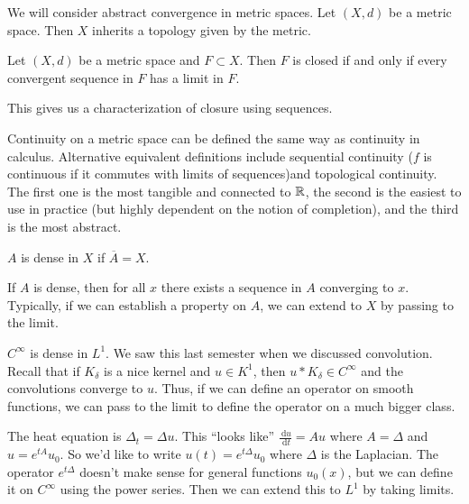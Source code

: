 \documentclass[10pt, twoside]{article}
\renewcommand{\d}{\ \mathrm{d}}
\begin{document}
    We will consider abstract convergence in metric spaces. Let $(X,d)$ be a metric space. Then $X$ inherits a topology given by the metric. 

    \begin{lem}
        Let $(X,d)$ be a metric space and $F \subset X$. Then $F$ is closed if and only if every convergent sequence in $F$ has a limit in $F$.
    \end{lem}

    This gives us a characterization of closure using sequences.

    \begin{exm}[Continuity]
        Continuity on a metric space can be defined the same way as continuity in calculus. Alternative equivalent definitions include sequential continuity ($f$ is continuous if it commutes with limits of sequences)and topological continuity. The first one is the most tangible and connected to $\mathbb{R}$, the second is the easiest to use in practice (but highly dependent on the notion of completion), and the third is the most abstract. 
    \end{exm}

    \begin{defn}[Density]
        $A$ is dense in $X$ if $\overline{A} = X$.
    \end{defn}

    \begin{rmk}
        If $A$ is dense, then for all $x$ there exists a sequence in $A$ converging to $x$. Typically, if we can establish a property on $A$, we can extend to $X$ by passing to the limit.
    \end{rmk}

    \begin{exm}
        $C^{\infty}$ is dense in $L^1$. We saw this last semester when we discussed convolution. Recall that if $K_{\delta}$ is a nice kernel and $u \in K^1$, then $u * K_{\delta} \in C^{\infty}$ and the convolutions converge to $u$. Thus, if we can define an operator on smooth functions, we can pass to the limit to define the operator on a much bigger class.
    \end{exm}

    \begin{exm}
        The heat equation is $\Delta_t = \Delta u$. This ``looks like'' $\frac{\d u}{\d t} = Au$ where $A = \Delta$ and $u=e^{tA}u_0$. So we'd like to write $u(t) = e^{t\Delta}u_0$ where $\Delta $ is the Laplacian. The operator $e^{t\Delta}$ doesn't make sense for general functions $u_0(x)$, but we can define it on $C^{\infty}$ using the power series. Then we can extend this to $L^1$ by taking limits.
    \end{exm}
\end{document}

